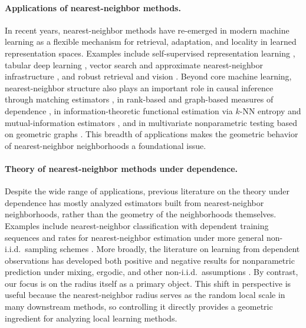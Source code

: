 \documentclass[12pt]{article}
\theoremstyle{definition}
\begin{document}
\paragraph*{Applications of nearest-neighbor methods.} In recent years, nearest-neighbor methods have re-emerged in modern machine learning as a flexible mechanism for retrieval, adaptation, and locality in learned representation spaces. Examples include self-supervised representation learning \citep{avdiukhin2024embedding,long2025mnn}, tabular deep learning \citep{gorishniy2023tabr}, vector search and approximate nearest-neighbor infrastructure \citep{chen2021spann,yang2024cspg,jaasaari2024lorann,wang2021comprehensive}, and robust retrieval and vision \citep{wu2022retrievalguard,nizan2024k}. Beyond core machine learning, nearest-neighbor structure also plays an important role in causal inference through matching estimators \citep{abadie2006large,abadie2011bias,lin2023estimation,lin2025regression,cattaneo2025rosenbaum}, in rank-based and graph-based measures of dependence \citep{chatterjee2021new,azadkia2021simple,han2021extensions,lin2022limit,lin2023boosting,lin2024failure, shi2024azadkia, han2024azadkia}, in information-theoretic functional estimation via $k$-NN entropy and mutual-information estimators \citep{kozachenko1987sample,kraskov2004estimating}, and in multivariate nonparametric testing based on geometric graphs \citep{friedman1979multivariate,henze1999multivariate}. This breadth of applications makes the geometric behavior of nearest-neighbor neighborhoods a foundational issue.

\paragraph*{Theory of nearest-neighbor methods under dependence.} Despite the wide range of applications, previous literature on the theory under dependence has mostly analyzed estimators built from nearest-neighbor neighborhoods, rather than the geometry of the neighborhoods themselves. Examples include nearest-neighbor classification with dependent training sequences \citep{holst2001nearest} and rates for nearest-neighbor estimation under more general non-i.i.d.\ sampling schemes \citep{kulkarni1995rates}. More broadly, the literature on learning from dependent observations has developed both positive and negative results for nonparametric prediction under mixing, ergodic, and other non-i.i.d.\ assumptions \citep{yu1994rates, nobel1999limits,mohri2010stability}. By contrast, our focus is on the radius itself as a primary object. This shift in perspective is useful because the nearest-neighbor radius serves as the random local scale in many downstream methods, so controlling it directly provides a geometric ingredient for analyzing local learning methods.
\end{document}
